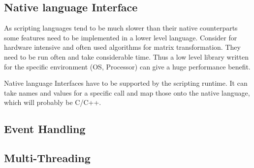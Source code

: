 \documentclass{article}
\begin{document}
\subsection{Native language Interface}
As scripting languages tend to be much slower than their native counterparts
some features need to be implemented in a lower level language. Consider for
hardware intensive and often used algorithms for matrix transformation. They
need to be run often and take considerable time. Thus a low level library written
for the specific environment (OS, Processor) can give a huge performance benefit.

Native language Interfaces have to be supported by the scripting runtime. It can
take names and values for a specific call and map those onto the native language,
which will probably be C/C++.

\subsection{Event Handling}

\subsection{Multi-Threading}
\end{document}

